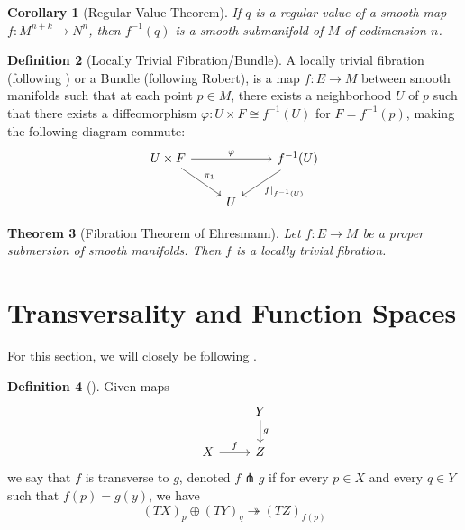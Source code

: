 \documentclass[reqno]{amsart}
\newtheorem{theorem}{Theorem}[section]
\newtheorem{corollary}[theorem]{Corollary}
\theoremstyle{definition}
\newtheorem{definition}[theorem]{Definition}
\theoremstyle{remark}
\begin{document}
\begin{corollary}[Regular Value Theorem]\label{Regular-Value-Theorem}
    If $q$ is a regular value of a smooth map
    $f \colon M^{n+k} \to N^{n}$, then
    $f^{-1}(q)$ is a smooth submanifold of $M$ of codimension
    $n$.
\end{corollary}



\begin{definition}[Locally Trivial Fibration/Bundle]
    A locally trivial fibration (following \cite{JB}) or
    a Bundle (following Robert), is
    a map $f \colon E \to M$ between smooth manifolds
    such that at each point $p \in M$, there exists
    a neighborhood $U$ of $p$ such that there
    exists a diffeomorphism
    $\varphi \colon U \times F \cong f^{-1}(U)$ for
    $F = f^{-1}(p)$, making the following diagram
    commute:
    \begin{equation*}
    \begin{tikzcd}
        U \ar[dr, "\pi_1"] \times F \ar[rr, "\varphi "] 
        & & f^{-1}(U) \ar[dl, "f|_{f^{-1}(U)}"] \\
        & U &
    \end{tikzcd}
    \end{equation*}
    
\end{definition}



\begin{theorem}[Fibration Theorem of Ehresmann]
    Let $f \colon E \to M$ be a proper
    submersion of smooth manifolds. Then
    $f$ is a locally trivial fibration.
\end{theorem}



\newpage

\section{Transversality and Function Spaces}

For this section, we will closely be following
\cite{GG}.


\begin{definition}[]
    Given maps
    \begin{equation*}
    \begin{tikzcd}
        & Y \ar[d,"g"] \\
        X \ar[r, "f"] & Z
    \end{tikzcd}
    \end{equation*}
    we say that $f$ is transverse to $g$, denoted
    $f \pitchfork g$ if for every
    $p \in X$ and every $q \in Y$ such that
    $f(p) = g(y)$, we have
    \[
        \left( TX \right)_p \oplus \left( TY \right)_{q}
        \twoheadrightarrow \left( TZ \right)_{f(p)}
    \] 
\end{definition}
\end{document}
